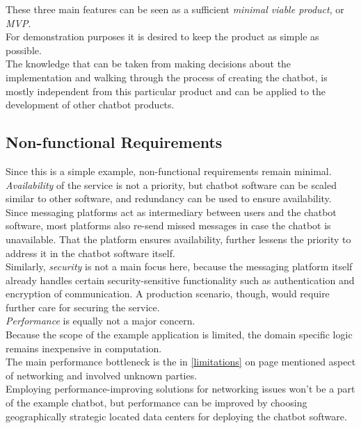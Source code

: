 These three main features can be seen as a sufficient \emph{minimal viable product}, or \emph{MVP}.
\\

For demonstration purposes it is desired to keep the product as simple as possible.
\\
The knowledge that can be taken from making decisions about the implementation and walking through the process of creating the chatbot,
is mostly independent from this particular product and can be applied to the development of other chatbot products.


\subsection{Non-functional Requirements}

Since this is a simple example, non-functional requirements remain minimal.
\\

\emph{Availability} of the service is not a priority, but chatbot software can be scaled similar to other software,
and redundancy can be used to ensure availability.
\\
Since messaging platforms act as intermediary between users and the chatbot software, most platforms also re-send missed messages in case the chatbot is unavailable.
That the platform ensures availability, further lessens the priority to address it in the chatbot software itself.
\\

Similarly, \emph{security} is not a main focus here, because the messaging platform itself already handles certain security-sensitive functionality such as authentication and encryption of communication. A production scenario, though, would require further care for securing the service.
\\

\emph{Performance} is equally not a major concern.
\\
Because the scope of the example application is limited,
the domain specific logic remains inexpensive in computation.
\\
The main performance bottleneck is the in \ref{limitations} on page \pageref{limitations} mentioned aspect of networking and involved unknown parties.
\\
Employing performance-improving solutions for networking issues won't be a part of the example chatbot,
but performance can be improved by choosing geographically strategic located data centers for deploying the chatbot software.
\\

